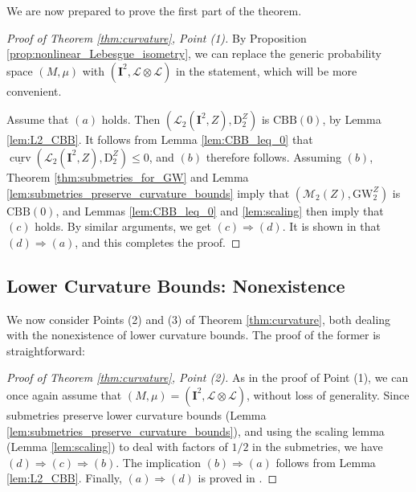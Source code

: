 \documentclass{article}
\theoremstyle{definition}
\newcommand{\M}{\mathcal{M}}
\newcommand{\MZ}[1]{\M_{#1}(Z)}
\newcommand{\dgw}[1]{\mathrm{GW}_{#1}^Z}
\newcommand{\Lpp}[1]{\mathcal{L}_{#1}}
\newcommand{\dz}[1]{\mathrm{D}^Z_{#1}}
\newcommand{\curv}{\underline{\operatorname{curv}}}
\begin{document}
We are now prepared to prove the first part of the theorem.

\begin{proof}[Proof of Theorem \ref{thm:curvature}, Point (1)]
    By Proposition \ref{prop:nonlinear_Lebesgue_isometry}, we can replace the generic probability space $(M,\mu)$ with $(\mathbf{I}^2,\mathscr{L} \otimes \mathscr{L})$ in the statement, which will be more convenient.

        Assume that $(a)$ holds. Then $(\Lpp{2}(\mathbf{I}^2,Z),\dz{2})$ is $\mathrm{CBB}(0)$, by Lemma \ref{lem:L2_CBB}. It follows from Lemma \ref{lem:CBB_leq_0} that $\curv(\Lpp{2}(\mathbf{I}^2,Z),\dz{2}) \leq 0$, and $(b)$ therefore follows. Assuming $(b)$, Theorem \ref{thm:submetries_for_GW} and Lemma \ref{lem:submetries_preserve_curvature_bounds} imply that  $(\MZ{2}, \dgw{2})$ is $\mathrm{CBB}(0)$, and Lemmas \ref{lem:CBB_leq_0} and \ref{lem:scaling} then imply that $(c)$ holds. By similar arguments, we get $(c) \Rightarrow (d)$. It is shown in \cite[Proposition 2.10 (iv)]{Sturm2006geometryI} that $(d) \Rightarrow (a)$, and this completes the proof.
\end{proof}


%
%
%
%
%
%
%
%
%



%

%
%
%


\subsection{Lower Curvature Bounds: Nonexistence}\label{sec:no_lower_curvature}

We now consider Points (2) and (3) of Theorem \ref{thm:curvature}, both dealing with the nonexistence of lower curvature bounds. The proof of the former is straightforward:

%

%
%
%
%
%
%
%
%
%

\begin{proof}[Proof of Theorem \ref{thm:curvature}, Point (2)]
    As in the proof of Point (1), we can once again assume that $(M,\mu) = (\mathbf{I}^2,\mathscr{L} \otimes \mathscr{L})$, without loss of generality. Since submetries preserve lower curvature bounds (Lemma \ref{lem:submetries_preserve_curvature_bounds}), and using the scaling lemma (Lemma \ref{lem:scaling}) to deal with factors of $1/2$ in the submetries, we have $(d) \Rightarrow (c) \Rightarrow (b)$. The implication $(b) \Rightarrow (a)$ follows from Lemma \ref{lem:L2_CBB}. Finally, $(a) \Rightarrow (d)$ is proved in \cite[Proposition 2.10 (iv)]{Sturm2006geometryI}.
\end{proof}
\end{document}
